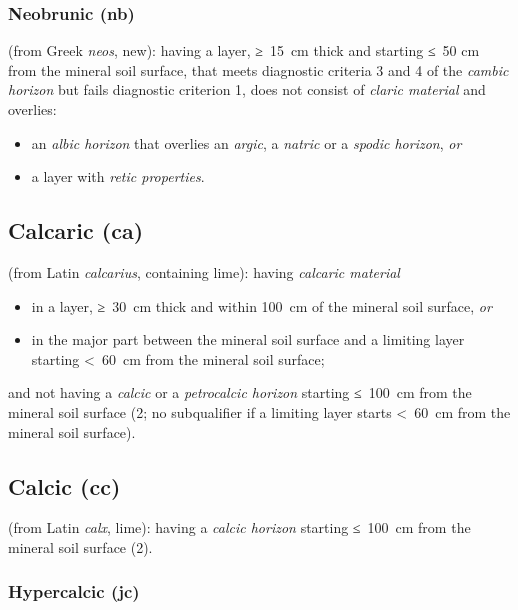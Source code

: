 \documentclass[
  letterpaper,
  DIV=11,
  numbers=noendperiod]{scrreprt}
\providecommand{\tightlist}{%
  \setlength{\itemsep}{0pt}\setlength{\parskip}{0pt}}\usepackage{longtable,booktabs,array}
\begin{document}
\hypertarget{neobrunic-nb}{%
\subsubsection{Neobrunic (nb)}\label{neobrunic-nb}}

(from Greek \emph{neos}, new): having a layer, ≥~15~cm thick and
starting ≤~50 cm from the mineral soil surface, that meets diagnostic
criteria 3 and 4 of the \emph{cambic horizon} but fails diagnostic
criterion 1, does not consist of \emph{claric material} and overlies:

\begin{itemize}
\tightlist
\item
  an \emph{albic horizon} that overlies an \emph{argic}, a \emph{natric}
  or a \emph{spodic horizon}, \emph{or}
\item
  a layer with \emph{retic properties}.
\end{itemize}

\hypertarget{calcaric-ca}{%
\subsection{Calcaric (ca)}\label{calcaric-ca}}

(from Latin \emph{calcarius}, containing lime): having \emph{calcaric
material}

\begin{itemize}
\item
  in a layer, ≥~30~cm thick and within 100~cm of the mineral soil
  surface, \emph{or}
\item
  in the major part between the mineral soil surface and a limiting
  layer starting \textless~60~cm from the mineral soil surface;
\end{itemize}

and not having a \emph{calcic} or a \emph{petrocalcic horizon} starting
≤~100~cm from the mineral soil surface (2; no subqualifier if a limiting
layer starts \textless~60~cm from the mineral soil surface).

\hypertarget{calcic-cc}{%
\subsection{Calcic (cc)}\label{calcic-cc}}

(from Latin \emph{calx}, lime): having a \emph{calcic horizon} starting
≤~100~cm from the mineral soil surface (2).

\hypertarget{hypercalcic-jc}{%
\subsubsection{Hypercalcic (jc)}\label{hypercalcic-jc}}
\end{document}
